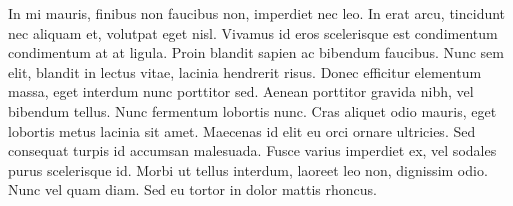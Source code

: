 In mi mauris, finibus non faucibus non, imperdiet nec leo. In erat arcu, tincidunt nec aliquam et, volutpat eget nisl. Vivamus id eros scelerisque est condimentum condimentum at at ligula. Proin blandit sapien ac bibendum faucibus. Nunc sem elit, blandit in lectus vitae, lacinia hendrerit risus. Donec efficitur elementum massa, eget interdum nunc porttitor sed. Aenean porttitor gravida nibh, vel bibendum tellus. Nunc fermentum lobortis nunc. Cras aliquet odio mauris, eget lobortis metus lacinia sit amet. Maecenas id elit eu orci ornare ultricies. Sed consequat turpis id accumsan malesuada. Fusce varius imperdiet ex, vel sodales purus scelerisque id. Morbi ut tellus interdum, laoreet leo non, dignissim odio. Nunc vel quam diam. Sed eu tortor in dolor mattis rhoncus.
